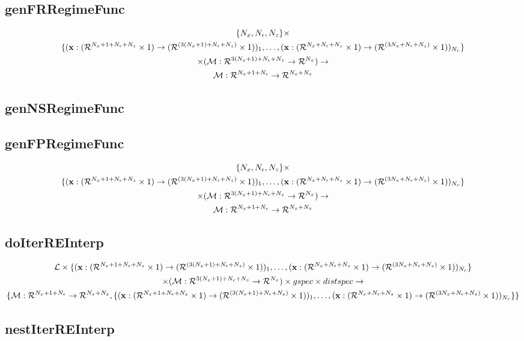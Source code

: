 \documentclass[12pt]{article}
\begin{document}
\subsection{genFRRegimeFunc}
\label{sec:genfrregimefunc}



{\small
\begin{gather*}
\{\numX,\numEps,\numZ\}\times\\
\{(\lilXRegimeFuncSig)_1,\ldots,(\lilXFuncSig)_{\numR}\}  \\
 \times (\eqnRegimeFuncSig )\rightarrow\\
\frfpnsRegimeFuncSig
\end{gather*}
}





\subsection{genNSRegimeFunc}
\label{sec:gennsfunc}



\subsection{genFPRegimeFunc}
\label{sec:genfpregimefunc}




{\small
\begin{gather*}
\{\numX,\numEps,\numZ\}\times\\
\{(\lilXRegimeFuncSig)_1,\ldots,(\lilXFuncSig)_{\numR}\}  \\
 \times (\eqnRegimeFuncSig )\rightarrow\\
\frfpnsRegimeFuncSig
\end{gather*}
}

\subsection{doIterREInterp}
\label{sec:doiterreinterp}

\begin{gather*}
  \linMod \times 
\{(\lilXRegimeFuncSig)_1,\ldots,(\lilXFuncSig)_{\numR}\}  \\
 \times (\eqnRegimeFuncSig ) \times gspec \times distspec \rightarrow\\
\{\frfpnsRegimeFuncSig, \{(\lilXRegimeFuncSig)_1,\ldots,(\lilXFuncSig)_{\numR}\}\}
\end{gather*}



\subsection{nestIterREInterp}
\label{sec:nestiterreinterp}

  



 
 
\end{document}
